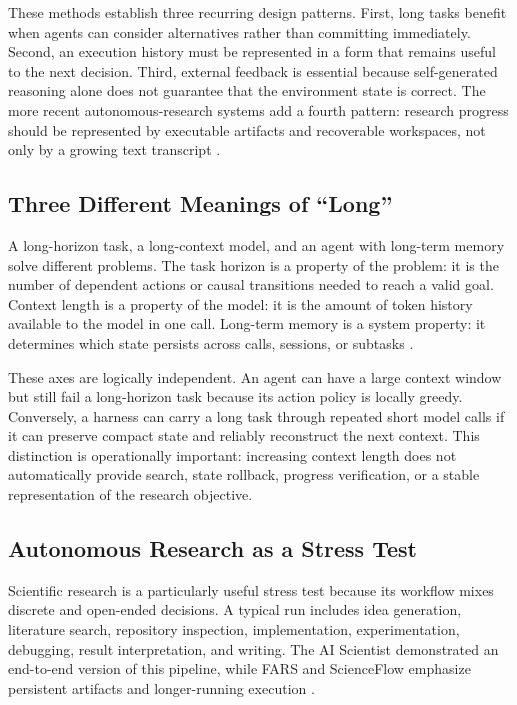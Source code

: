 \documentclass[manuscript,screen]{acmart}
\begin{document}
These methods establish three recurring design patterns. First, long tasks benefit when agents can consider alternatives rather than committing immediately. Second, an execution history must be represented in a form that remains useful to the next decision. Third, external feedback is essential because self-generated reasoning alone does not guarantee that the environment state is correct. The more recent autonomous-research systems add a fourth pattern: research progress should be represented by executable artifacts and recoverable workspaces, not only by a growing text transcript \cite{tang2026fars,zhao2026scienceflow}.

\subsection{Three Different Meanings of ``Long''}
A long-horizon task, a long-context model, and an agent with long-term memory solve different problems. The task horizon is a property of the problem: it is the number of dependent actions or causal transitions needed to reach a valid goal. Context length is a property of the model: it is the amount of token history available to the model in one call. Long-term memory is a system property: it determines which state persists across calls, sessions, or subtasks \cite{chen2026horizongap}.

These axes are logically independent. An agent can have a large context window but still fail a long-horizon task because its action policy is locally greedy. Conversely, a harness can carry a long task through repeated short model calls if it can preserve compact state and reliably reconstruct the next context. This distinction is operationally important: increasing context length does not automatically provide search, state rollback, progress verification, or a stable representation of the research objective.

\subsection{Autonomous Research as a Stress Test}
Scientific research is a particularly useful stress test because its workflow mixes discrete and open-ended decisions. A typical run includes idea generation, literature search, repository inspection, implementation, experimentation, debugging, result interpretation, and writing. The AI Scientist demonstrated an end-to-end version of this pipeline, while FARS and ScienceFlow emphasize persistent artifacts and longer-running execution \cite{lu2024aiscientist,tang2026fars,zhao2026scienceflow}.
\end{document}
